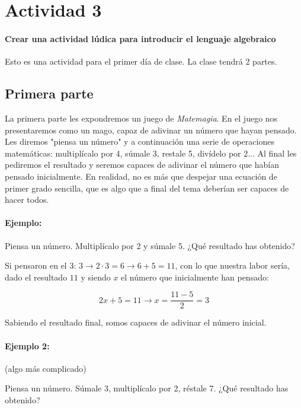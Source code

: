 

\section{Actividad 3}

\paragraph{Crear una actividad lúdica para introducir el lenguaje algebraico}

Esto es una actividad para el primer día de clase. La clase tendrá 2 partes.

\subsection{Primera parte}


La primera parte les expondremos un juego de \textit{Matemagia}.
%
En el juego nos presentaremos como un mago, capaz de adivinar un número que hayan pensado.
%
Les diremos "piensa un número" y a continuación una serie de operaciones matemáticas: multiplícalo por 4, súmale 3, restale 5, divídelo por 2... 
%
Al final les pediremos el resultado y seremos capaces de adivinar el número que habían pensado inicialmente. 
%
En realidad, no es más que despejar una ecuación de primer grado sencilla, que es algo que a final del tema deberían ser capaces de hacer todos. 



\paragraph{Ejemplo:}

Piensa un número. Multiplícalo por 2 y súmale 5. ¿Qué resultado has obtenido? 

Si pensaron en el 3: $ 3\to 2·3 = 6\to 6+5 = 11 $, con lo que nuestra labor sería, dado el resultado $11$ y siendo $x$ el número que inicialmente han pensado:

\[
	2x+5 = 11 \to x = \frac{11-5}{2} = 3
\]

Sabiendo el resultado final, somos capaces de adivinar el número inicial.

\paragraph{Ejemplo 2:}(algo más complicado)

Piensa un número. Súmale 3, multiplícalo por 2, réstale 7. ¿Qué resultado has obtenido?

